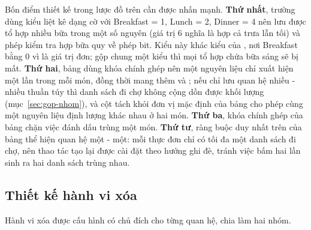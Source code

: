 Bốn điểm thiết kế trong lược đồ trên cần được nhấn mạnh. \textbf{Thứ nhất},
trường  dùng kiểu liệt kê dạng cờ với Breakfast = 1,
Lunch = 2, Dinner = 4 nên lưu được tổ hợp nhiều bữa trong một số nguyên (giá trị
6 nghĩa là hợp cả trưa lẫn tối) và phép kiểm tra hợp bữa quy về phép 
bit. Kiểu này khác kiểu  của , nơi Breakfast
bằng 0 vì là giá trị đơn; gộp chung một kiểu thì mọi tổ hợp chứa bữa sáng sẽ bị
mất. \textbf{Thứ hai}, bảng  dùng khóa chính ghép nên
một nguyên liệu chỉ xuất hiện một lần trong mỗi món, đồng thời mang thêm
 và ; nếu chỉ lưu quan hệ nhiều - nhiều thuần túy thì
danh sách đi chợ không cộng dồn được khối lượng (mục~\ref{sec:gop-nhom}), và cột
 tách khỏi đơn vị mặc định của bảng  cho phép cùng
một nguyên liệu định lượng khác nhau ở hai món. \textbf{Thứ ba}, khóa chính ghép
 của bảng  chặn việc đánh dấu trùng một
món. \textbf{Thứ tư}, ràng buộc duy nhất trên  của bảng
 thể hiện quan hệ một - một: mỗi thực đơn chỉ có tối đa một
danh sách đi chợ, nên thao tác tạo lại được cài đặt theo hướng ghi đè, tránh
việc bấm hai lần sinh ra hai danh sách trùng nhau.

\subsection{Thiết kế hành vi xóa}
\label{sec:hanh-vi-xoa}

Hành vi xóa được cấu hình có chủ đích cho từng quan hệ, chia làm hai nhóm.

